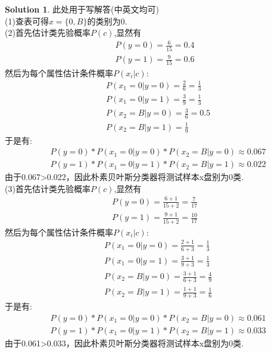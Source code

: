 \documentclass[a4paper,UTF8]{article}
\theoremstyle{definition}
\newtheorem*{solution}{Solution}
\begin{document}
\begin{solution}
此处用于写解答(中英文均可)\\
(1)查表可得$x=\{0,B\}$的类别为$0$.\\
(2)首先估计类先验概率$P(c)$,显然有
\begin{equation*}
	\begin{split}
		P(y=0)=\frac{6}{15}=0.4\\
		P(y=1)=\frac{9}{15}=0.6
	\end{split}
\end{equation*}
然后为每个属性估计条件概率$P(x_i|c)$:
\begin{equation*}
	\begin{split}
		&P(x_1=0|y=0) = \frac{2}{6}=\frac{1}{3}\\
		&P(x_1=0|y=1) = \frac{3}{9}=\frac{1}{3}\\
		&P(x_2=B|y=0) = \frac{3}{6}=0.5\\
		&P(x_2=B|y=1)=\frac{1}{9}
	\end{split}
\end{equation*}
于是有:
\begin{equation*}
	\begin{split}
		&P(y=0)*P(x_1=0|y=0)*P(x_2=B|y=0)\approx 0.067\\
		&P(y=1)*P(x_1=0|y=1)*P(x_2=B|y=1)\approx 0.022
	\end{split}
\end{equation*}
由于0.067>0.022，因此朴素贝叶斯分类器将测试样本x盘别为0类.\\
(3)首先估计类先验概率$P(c)$,显然有
\begin{equation*}
	\begin{split}
		P(y=0)=\frac{6+1}{15+2}=\frac{7}{17}\\
		P(y=1)=\frac{9+1}{15+2}=\frac{10}{17}
	\end{split}
\end{equation*}
然后为每个属性估计条件概率$P(x_i|c)$:
\begin{equation*}
	\begin{split}
		&P(x_1=0|y=0) = \frac{2+1}{6+3}=\frac{1}{3}\\
		&P(x_1=0|y=1) = \frac{3+1}{9+3}=\frac{1}{3}\\
		&P(x_2=B|y=0) = \frac{3+1}{6+3}=\frac{4}{9}\\
		&P(x_2=B|y=1)=\frac{1+1}{9+3} = \frac{1}{6}
	\end{split}
\end{equation*}
于是有:
\begin{equation*}
	\begin{split}
		&P(y=0)*P(x_1=0|y=0)*P(x_2=B|y=0)\approx 0.061\\
		&P(y=1)*P(x_1=0|y=1)*P(x_2=B|y=1)\approx 0.033
	\end{split}
\end{equation*}
由于0.061>0.033，因此朴素贝叶斯分类器将测试样本x盘别为0类.\\
\end{solution}
\end{document}
